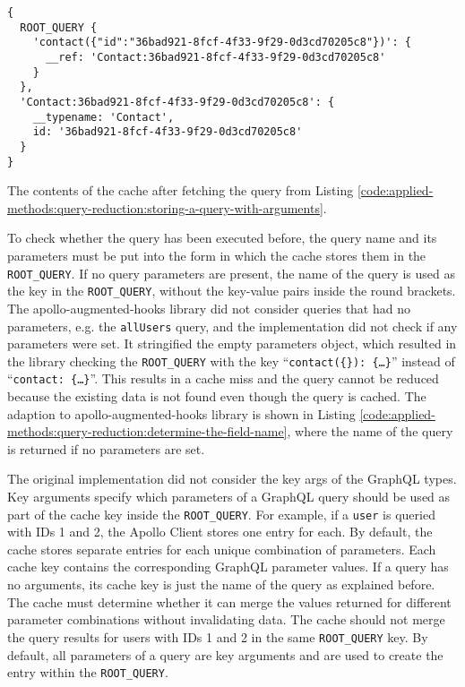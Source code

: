 \ifshowListings
\begin{listing}[H]
  \begin{verbatim}
{
  ROOT_QUERY {
    'contact({"id":"36bad921-8fcf-4f33-9f29-0d3cd70205c8"})': {
      __ref: 'Contact:36bad921-8fcf-4f33-9f29-0d3cd70205c8'
    }
  },
  'Contact:36bad921-8fcf-4f33-9f29-0d3cd70205c8': {
    __typename: 'Contact',
    id: '36bad921-8fcf-4f33-9f29-0d3cd70205c8'
  }
}
  \end{verbatim}
  \caption{The contents of the cache after fetching the query from Listing \ref{code:applied-methods:query-reduction:storing-a-query-with-arguments}.}\label{code:applied-methods:query-reduction:cache-representation-of-query-with-arguments}
\end{listing}
\fi

\noindent To check whether the query has been executed before, the query name and its parameters must be put into the form in which the cache stores them in the \texttt{ROOT\_QUERY}. If no query parameters are present, the name of the query is used as the key in the \texttt{ROOT\_QUERY}, without the key-value pairs inside the round brackets. The apollo-augmented-hooks library did not consider queries that had no parameters, e.g. the \texttt{allUsers} query, and the implementation did not check if any parameters were set. It stringified the empty parameters object, which resulted in the library checking the \texttt{ROOT\_QUERY} with the key \enquote{\texttt{contact(\{\}): \{\dots\}}} instead of \enquote{\texttt{contact: \{\dots\}}}. This results in a cache miss and the query cannot be reduced because the existing data is not found even though the query is cached. The adaption to apollo-augmented-hooks library is shown in Listing \ref{code:applied-methods:query-reduction:determine-the-field-name}, where the name of the query is returned if no parameters are set.

\bigskip

\noindent The original implementation did not consider the key args of the GraphQL types. Key arguments specify which parameters of a GraphQL query should be used as part of the cache key inside the \texttt{ROOT\_QUERY}. For example, if a \texttt{user} is queried with \acp{ID} 1 and 2, the Apollo Client stores one entry for each. By default, the cache stores separate entries for each unique combination of parameters. Each cache key contains the corresponding GraphQL parameter values. If a query has no arguments, its cache key is just the name of the query as explained before. The cache must determine whether it can merge the values returned for different parameter combinations without invalidating data. The cache should not merge the query results for users with \acp{ID} 1 and 2 in the same \texttt{ROOT\_QUERY} key. By default, all parameters of a query are key arguments and are used to create the entry within the \texttt{ROOT\_QUERY}.  \cite{misc:-:applied-methods:query-reduction:key-args}

